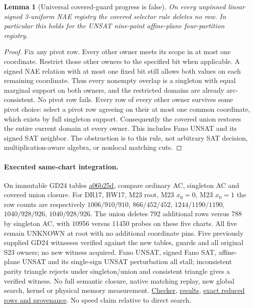 \documentclass[11pt]{article}
\newtheorem{lemma}[theorem]{Lemma}
\begin{document}
\begin{lemma}[Universal covered-guard progress is false]\label{lem:m24-stall}
On every unpinned linear signed 3-uniform NAE registry the covered selector rule deletes no row. In particular this holds for the UNSAT nine-point affine-plane four-partition registry.
\end{lemma}
\begin{proof}
Fix any pivot row. Every other owner meets its scope in at most one coordinate. Restrict those other owners to the specified bit when applicable. A signed NAE relation with at most one fixed bit still allows both values on each remaining coordinate. Thus every nonempty overlap is a singleton with equal marginal support on both owners, and the restricted domains are already arc-consistent. No pivot row fails. Every row of every other owner survives some pivot choice: select a pivot row agreeing on their at most one common coordinate, which exists by full singleton support. Consequently the covered union restores the entire current domain at every owner. This includes Fano UNSAT and its signed SAT neighbor. The obstruction is to this rule, not arbitrary SAT decision, multiplication-aware algebra, or nonlocal matching cuts.
\end{proof}
\paragraph{Executed same-chart integration.}
On immutable GD24 tables \href{https://github.com/j15marti/pnp/commit/a06b25dad6c0d06f689a201825e2d267269cf181}{a06b25d}, compare ordinary AC, singleton AC and covered union closure. For DR17, BW17, M23 root, M23 $x_0=0$, M23 $x_0=1$ the row counts are respectively $1006/910/910$, $866/452/452$, $1244/1190/1190$, $1040/928/926$, $1040/928/926$. The union deletes 792 additional rows versus 788 by singleton AC, with 10956 versus 11450 probes on these five charts. All five remain UNKNOWN at root with no additional coordinate pins. Five previously supplied GD24 witnesses verified against the new tables, guards and all original S23 owners; no new witness acquired. Fano UNSAT, signed Fano SAT, affine-plane UNSAT and its single-sign UNSAT perturbation all stall; inconsistent parity triangle rejects under singleton/union and consistent triangle gives a verified witness. No full semantic closure, native matching replay, new global search, kernel or physical memory measurement. \href{https://github.com/j15marti/pnp/commit/7e1164f43763ea4efe7f0a506432cbd996145a9e}{Checker}, \href{https://github.com/j15marti/pnp/commit/0caa97d249fb20a7feb5cc11df304971f3083cef}{results}, \href{https://github.com/j15marti/pnp/commit/41f861068ff38ae5e75d753e6bf47c965d3c27ce}{exact reduced rows and provenance}. No speed claim relative to direct search.
\end{document}

